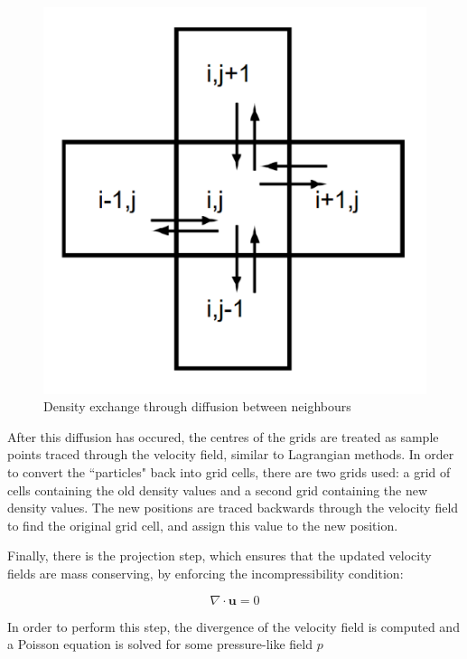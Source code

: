 \documentclass[12pt]{article}
\begin{document}
    \begin{figure}[H]
        \begin{center}
            \includegraphics{neighbourDiff.png}
        \end{center}
        \caption{Density exchange through diffusion between neighbours \cite{stam}}   
    \end{figure}

    After this diffusion has occured, the centres of the grids are treated as sample points traced through the velocity field, similar to Lagrangian methods. In order to convert the ``particles" back into grid cells, there are two grids used: a grid of cells containing the old density values and a second grid containing the new density values. The new positions are traced backwards through the velocity field to find the original grid cell, and assign this value to the new position.

    Finally, there is the projection step, which ensures that the updated velocity fields are mass conserving, by enforcing the incompressibility condition: 
    
    \begin{equation}
        \nabla \cdot \textbf{u} = 0
    \end{equation}
    
    In order to perform this step, the divergence of the velocity field is computed and a Poisson equation is solved for some pressure-like field $p$
    
\end{document}
